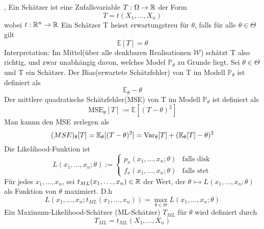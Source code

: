 \sep
\Def[1.1] \newline
Ein Schätzer ist eine Zufallsvariable \(T : \Omega \rightarrow \mathbb{R} \) der Form \[ T = t(X_1, \dots , X_n)\] wobei \(t : \mathbb{R}^n \rightarrow \mathbb{R}\)
\Def[1.2] \newline
Ein Schätzer T heisst erwartungstreu für \( \theta \), falls für alle \( \theta \in \Theta\) gilt \[ \mathbb{E}[T] = \theta\]
\Bem[1.2A] \newline
Interpretation: Im Mittel(über alle denkbaren Realisationen \(\mathcal{W}\)) schätzt T also richtig, und zwar unabhängig davon, welches Model \(\mathbb{P}_\theta \) zu Grunde liegt.
\Def[1.3] Sei \(\theta \in \Theta \) und T ein Schätzer. Der Bias(erwartete Schätzfehler) von T im Modell \( \mathbb{P}_\theta\) ist definiert als \[ \mathbb{E}_\theta - \theta\]
Der mittlere quadratische Schätzfehler(MSE) von T im Modell \( \mathbb{P}_\theta\) ist definiert als \[\text{MSE}_\theta[T] := \mathbb{E}[(T - \theta)^2]\]
\Bem[1.3A] \newline
Man kannn den MSE zerlegen als \[ \text(MSE)_\theta[T] = \mathbb{E}_\theta[(T - \theta)^2] = \text{Var}_\theta[T] + (\mathbb{E}_\theta[T] - \theta)^2\]
\Def[1.4] \newline
Die Likelihood-Funktion ist \[L(x_1, \dots , x_n; \theta) := \left.
    \begin{cases}
    p_{x}(x_1, \dots , x_n; \theta) & \text{falls disk} \\
    f_{x}(x_1, \dots , x_n; \theta) & \text{falls stet}
\end{cases}
\right.\]
\Def[1.5] \newline
Für jedes \(x_1, \dots , x_n\), sei \(t_{ML}(x_1, \dots, x_n) \in \mathbb{R}\) der Wert, der \(\theta \rightarrowtail L(x_1, \dots , x_n; \theta )\) als Funktion von \( \theta \) maximiert. D.h
\[L(x_1, \dots , x_n; t_{ML}(x_1, \dots , x_n)) = \max_{\theta \in \Theta} L(x_1, \dots , x_n; \theta)\]
Ein Maximum-Likelihood-Schätzer (ML-Schätzer) \(T_{ML}\) für \( \theta \) wird definiert durch \[ T_{ML} = t_{ML}(X_1, \dots , X_n)\]
